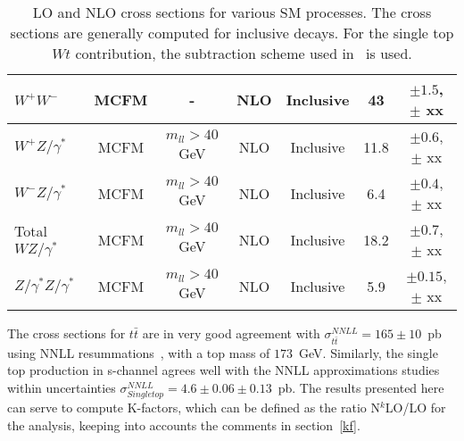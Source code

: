 \begin{table}[hbt]
\begin{center}
\begin{tabular}{|l|c|c|c|c|c|c|}
$W^+W^-$ & MCFM & - & NLO & Inclusive & 43 & $\pm 1.5$, $\pm$ xx \\ \hline
$W^+Z/\gamma^*$ & MCFM & $m_{ll} > 40$ GeV & NLO & Inclusive & 11.8 & $\pm 0.6$, $\pm$ xx \\ \hline
$W^-Z/\gamma^*$ & MCFM & $m_{ll} > 40$ GeV & NLO & Inclusive & 6.4 & $\pm 0.4$, $\pm$ xx \\ \hline
Total $WZ/\gamma^*$ & MCFM & $m_{ll} > 40$ GeV & NLO & Inclusive & 18.2 & $\pm 0.7$, $\pm$ xx \\ \hline
$Z/\gamma^*Z/\gamma^*$ & MCFM & $m_{ll} > 40$ GeV & NLO & Inclusive & 5.9 & $\pm 0.15$, $\pm$ xx \\ \hline
\end{tabular} 
\caption{LO and NLO cross sections for various SM processes. The cross sections are generally
computed for inclusive decays. For the single top $Wt$ contribution, the subtraction scheme
used in~\cite{Wtsubscheme} is used. \label{tab:nlo}}
\end{center}
\end{table}

The cross sections for $t\bar{t}$ are in very good agreement with 
$\sigma^{NNLL}_{t\bar{t}} = 165 \pm 10$~pb using NNLL 
resummations~\cite{nnllttbar}, with a top mass of $173$~GeV. Similarly, the 
single top production in s-channel agrees well with the NNLL approximations 
studies~\cite{nnllschannel} within uncertainties 
$\sigma^{NNLL}_{Single top} = 4.6 \pm 0.06 \pm 0.13$~pb. The results presented 
here can serve to compute K-factors, which can be defined as the ratio 
N$^k$LO/LO for the analysis, keeping into accounts the comments in section~\ref{kf}.
